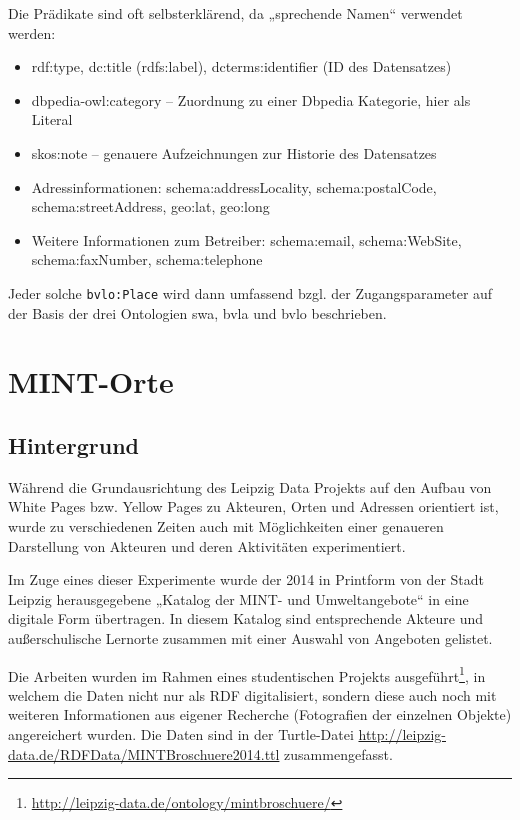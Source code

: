 \documentclass[a4paper,11pt]{article}
\begin{document}
Die Prädikate sind oft selbsterklärend, da „sprechende Namen“ verwendet werden:
\begin{itemize}\itemsep0pt
\item rdf:type, dc:title (rdfs:label), dcterms:identifier (ID des Datensatzes)
\item dbpedia-owl:category -- Zuordnung zu einer Dbpedia Kategorie, hier als
  Literal 
\item skos:note -- genauere Aufzeichnungen zur Historie des Datensatzes
\item Adressinformationen: schema:addressLocality,
  schema:postalCode,\\ schema:streetAddress, geo:lat, geo:long
\item Weitere Informationen zum Betreiber: schema:email, schema:WebSite,\\
  schema:faxNumber, schema:telephone
\end{itemize}
Jeder solche \texttt{bvlo:Place} wird dann umfassend bzgl. der Zugangsparameter
auf der Basis der drei Ontologien swa, bvla und bvlo beschrieben.
\newpage

\section{MINT-Orte}

\subsection{Hintergrund}
Während die Grundausrichtung des Leipzig Data Projekts auf den Aufbau von White
Pages bzw. Yellow Pages zu Akteuren, Orten und Adressen orientiert ist, wurde
zu verschiedenen Zeiten auch mit Möglichkeiten einer genaueren Darstellung von
Akteuren und deren Aktivitäten experimentiert.

Im Zuge eines dieser Experimente wurde der 2014 in Printform von der Stadt
Leipzig herausgegebene „Katalog der MINT- und Umweltangebote“ in eine digitale
Form übertragen. In diesem Katalog sind entsprechende Akteure und
außerschulische Lernorte zusammen mit einer Auswahl von Angeboten gelistet.

Die Arbeiten wurden im Rahmen eines studentischen Projekts
ausgeführt\footnote{\url{http://leipzig-data.de/ontology/mintbroschuere/}}, in
welchem die Daten nicht nur als RDF digitalisiert, sondern diese auch noch mit
weiteren Informationen aus eigener Recherche (Fotografien der einzelnen
Objekte) angereichert wurden. Die Daten sind in der Turtle-Datei
\url{http://leipzig-data.de/RDFData/MINTBroschuere2014.ttl} zusammengefasst.
\end{document}
